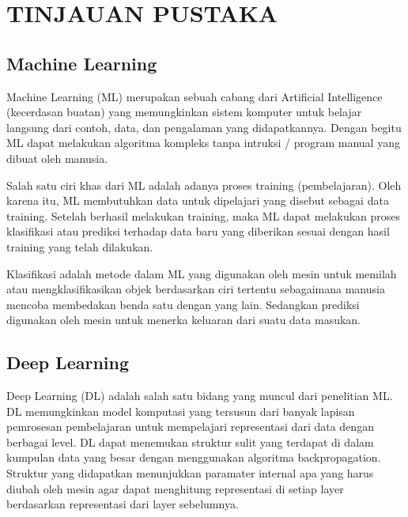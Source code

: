 \chapter{TINJAUAN PUSTAKA}


\section{Machine Learning}


Machine Learning (ML) merupakan sebuah cabang dari Artificial Intelligence (kecerdasan buatan) yang memungkinkan sistem
komputer untuk belajar langsung dari contoh, data, dan pengalaman yang didapatkannya. Dengan begitu ML dapat melakukan algoritma kompleks tanpa intruksi / program manual yang dibuat oleh manusia.

Salah satu ciri khas dari ML adalah adanya proses training (pembelajaran). Oleh karena itu, ML membutuhkan data untuk dipelajari yang disebut sebagai data training. Setelah berhasil melakukan
training, maka ML dapat melakukan proses klasifikasi atau prediksi terhadap data baru yang diberikan sesuai dengan hasil training
yang telah dilakukan.

Klasifikasi adalah metode dalam ML yang digunakan oleh mesin untuk memilah atau mengklasifikasikan objek
berdasarkan ciri tertentu sebagaimana manusia mencoba membedakan benda satu dengan yang lain\citep{shalev-shwartz_ben-david_2014}. Sedangkan prediksi digunakan oleh mesin untuk menerka keluaran dari suatu data
masukan. 

\section{Deep Learning}
Deep Learning (DL) adalah salah satu bidang yang muncul dari penelitian ML.
DL memungkinkan model komputasi yang tersusun dari banyak lapisan pemrosesan pembelajaran untuk mempelajari representasi dari data dengan berbagai level.
DL dapat menemukan struktur sulit yang terdapat di dalam kumpulan data yang besar dengan menggunakan algoritma backpropagation\citep{DBLP:journals/corr/ZhangBHRV16}.
Struktur yang didapatkan menunjukkan paramater internal apa yang harus diubah oleh mesin agar dapat menghitung representasi di setiap layer berdasarkan representasi dari layer sebelumnya.


